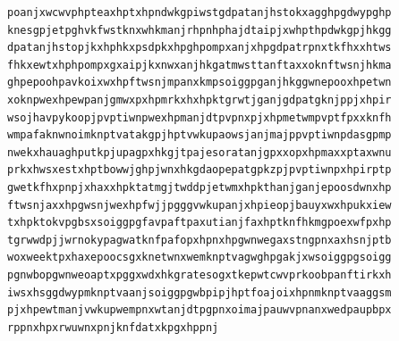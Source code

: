 \documentclass[11pt,letterpaper]{exam}
\begin{document}
\begin{questions}
\begin{verbatim}
poanjxwcwvphpteaxhptxhpndwkgpiwstgdpatanjhstokxagghpgdwypghp
knesgpjetpghvkfwstknxwhkmanjrhpnhphajdtaipjxwhpthpdwkgpjhkgg
dpatanjhstopjkxhphkxpsdpkxhpghpompxanjxhpgdpatrpnxtkfhxxhtws
fhkxewtxhphpompxgxaipjkxnwxanjhkgatmwsttanftaxxoknftwsnjhkma
ghpepoohpavkoixwxhpftwsnjmpanxkmpsoiggpganjhkggwnepooxhpetwn
xoknpwexhpewpanjgmwxpxhpmrkxhxhpktgrwtjganjgdpatgknjppjxhpir
wsojhavpykoopjpvptiwnpwexhpmanjdtpvpnxpjxhpmetwmpvptfpxxknfh
wmpafaknwnoimknptvatakgpjhptvwkupaowsjanjmajppvptiwnpdasgpmp
nwekxhauaghputkpjupagpxhkgjtpajesoratanjgpxxopxhpmaxxptaxwnu
prkxhwsxestxhptbowwjghpjwnxhkgdaopepatgpkzpjpvptiwnpxhpirptp
gwetkfhxpnpjxhaxxhpktatmgjtwddpjetwmxhpkthanjganjepoosdwnxhp
ftwsnjaxxhpgwsnjwexhpfwjjpgggvwkupanjxhpieopjbauyxwxhpukxiew
txhpktokvpgbsxsoiggpgfavpaftpaxutianjfaxhptknfhkmgpoexwfpxhp
tgrwwdpjjwrnokypagwatknfpafopxhpnxhpgwnwegaxstngpnxaxhsnjptb
woxweektpxhaxepoocsgxknetwnxwemknptvagwghpgakjxwsoiggpgsoigg
pgnwbopgwnweoaptxpggxwdxhkgratesogxtkepwtcwvprkoobpanftirkxh
iwsxhsggdwypmknptvaanjsoiggpgwbpipjhptfoajoixhpnmknptvaaggsm
pjxhpewtmanjvwkupwempnxwtanjdtpgpnxoimajpauwvpnanxwedpaupbpx
rppnxhpxrwuwnxpnjknfdatxkpgxhppnj
\end{verbatim}

\end{questions}
\end{document}
